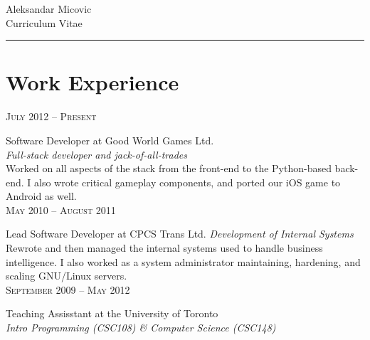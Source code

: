 \documentclass[10pt]{article}
\begin{document}
\color{text1}
    \par{\centering
            {\sffamily\Huge Aleksandar Micovic}\\	
            {\color{headings} 
                {\LARGE Curriculum Vitae}
            }
        \\[20pt]\par}
    {\color{white} \hrule}

	
\begin{minipage}[t]{0.5\textwidth}
    \vspace{0pt}
	
\section{Work Experience}
    \raggedleft
    \textsc{\normalsize July 2012 -- Present}\par

    \raggedright\large Software Developer at Good World Games Ltd.\\
    \emph{Full-stack developer and jack-of-all-trades}\\[5pt]

    \normalsize{Worked on all aspects of the stack from the front-end to the
	Python-based back-end. I also wrote critical gameplay components, and ported 
	our iOS game to Android as well.}\\[10pt]

    \raggedleft
    \textsc{\normalsize May 2010 -- August 2011}\par

    \raggedright\large Lead Software Developer at CPCS Trans Ltd.
    \emph{Development of Internal Systems}\\[5pt]

    \normalsize{Rewrote and then managed the internal systems used to handle business
	intelligence. I also worked as a system administrator maintaining, hardening, and 
	scaling GNU/Linux servers.}\\[10pt]

    \raggedleft
    \textsc{\normalsize September 2009 -- May 2012}\par

    \raggedright\large Teaching Assisstant at the University of Toronto\\
    \emph{Intro Programming (CSC108) \& Computer Science (CSC148)}


\end{minipage}
\end{document}
